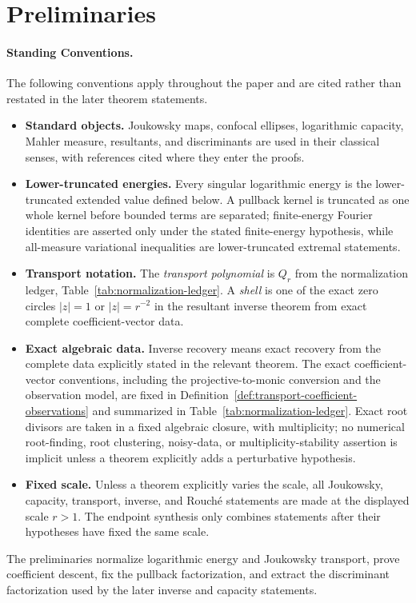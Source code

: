 \section{Preliminaries}\label{sec:preliminaries}
\paragraph{Standing Conventions.}\label{par:standing-conventions}
The following conventions apply throughout the paper and are cited rather
than restated in the later theorem statements.
\begin{itemize}[leftmargin=2em]
  \item \textbf{Standard objects.}  Joukowsky maps, confocal ellipses, logarithmic capacity, Mahler measure, resultants, and discriminants are used in their classical senses, with references cited where they enter the proofs.
  \item \textbf{Lower-truncated energies.}  Every singular logarithmic energy is the lower-truncated extended value defined below.  A pullback kernel is truncated as one whole kernel before bounded terms are separated; finite-energy Fourier identities are asserted only under the stated finite-energy hypothesis, while all-measure variational inequalities are lower-truncated extremal statements.
  \item \textbf{Transport notation.}  The \emph{transport polynomial} is \(Q_r\) from the normalization ledger, Table~\ref{tab:normalization-ledger}.  A \emph{shell} is one of the exact zero circles \(|z|=1\) or \(|z|=r^{-2}\) in the resultant inverse theorem from exact complete coefficient-vector data.
  \item \textbf{Exact algebraic data.}  Inverse recovery means exact recovery from the complete data explicitly stated in the relevant theorem.  The exact coefficient-vector conventions, including the projective-to-monic conversion and the observation model, are fixed in Definition~\ref{def:transport-coefficient-observations} and summarized in Table~\ref{tab:normalization-ledger}.  Exact root divisors are taken in a fixed algebraic closure, with multiplicity; no numerical root-finding, root clustering, noisy-data, or multiplicity-stability assertion is implicit unless a theorem explicitly adds a perturbative hypothesis.
  \item \textbf{Fixed scale.}  Unless a theorem explicitly varies the scale, all Joukowsky, capacity, transport, inverse, and Rouch\'e statements are made at the displayed scale \(r>1\).  The endpoint synthesis only combines statements after their hypotheses have fixed the same scale.
\end{itemize}
The preliminaries normalize logarithmic energy and Joukowsky transport, prove coefficient descent, fix the pullback factorization, and extract the discriminant factorization used by the later inverse and capacity statements.

